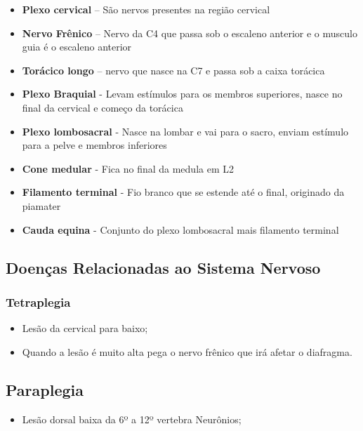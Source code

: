 \documentclass[
]{book}
\providecommand{\tightlist}{%
  \setlength{\itemsep}{0pt}\setlength{\parskip}{0pt}}
\begin{document}
\begin{itemize}
\tightlist
\item
  \textbf{Plexo cervical} -- São nervos presentes na região cervical
\item
  \textbf{Nervo Frênico} -- Nervo da C4 que passa sob o escaleno anterior e o musculo guia é o escaleno anterior
\item
  \textbf{Torácico longo} -- nervo que nasce na C7 e passa sob a caixa torácica
\item
  \textbf{Plexo Braquial} - Levam estímulos para os membros superiores, nasce no final da cervical e começo da
  torácica
\item
  \textbf{Plexo lombosacral} - Nasce na lombar e vai para o sacro, enviam estímulo para a pelve e membros inferiores
\item
  \textbf{Cone medular} - Fica no final da medula em L2
\item
  \textbf{Filamento terminal} - Fio branco que se estende até o final, originado da piamater
\item
  \textbf{Cauda equina} - Conjunto do plexo lombosacral mais filamento terminal
\end{itemize}

\hypertarget{doenuxe7as-relacionadas-ao-sistema-nervoso}{%
\subsection{Doenças Relacionadas ao Sistema Nervoso}\label{doenuxe7as-relacionadas-ao-sistema-nervoso}}

\hypertarget{tetraplegia}{%
\subsubsection{Tetraplegia}\label{tetraplegia}}

\begin{itemize}
\tightlist
\item
  Lesão da cervical para baixo;
\item
  Quando a lesão é muito alta pega o nervo frênico que irá afetar o diafragma.
\end{itemize}

\hypertarget{paraplegia}{%
\subsection{Paraplegia}\label{paraplegia}}

\begin{itemize}
\tightlist
\item
  Lesão dorsal baixa da 6º a 12º vertebra Neurônios;
\end{itemize}
\end{document}
